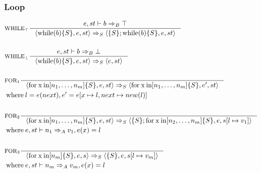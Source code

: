 \subsubsection{Loop}
\newcommand{\Tfor}{\mathbin{\text{for}}}
\newcommand{\Tx}{\mathbin{\text{x}}}
\newcommand{\Tin}{\mathbin{\text{in}}}
\newcommand{\Twhile}{\mathbin{\text{while}}}

\begin{align*}
&\inference[$\text{WHILE}_\top$]{e,st \vdash b \Rightarrow_B \top}
                       {\Braket{\Twhile(b)\{S\},e,st} \Rightarrow_S \Braket{\{S\}; \Twhile (b)\{S\},e,st}}
\\\\
&\inference[$\text{WHILE}_\bot$]{e,st \vdash b \Rightarrow_B \bot}
                       {\Braket{\Twhile(b)\{S\},e,st} \Rightarrow_S \Braket{e,st}}
\\\\
&\inference[$\text{FOR}_1$]{}
                       {\Braket{\Tfor \Tx \Tin [n_1,\dots,n_m]\{S\},e,st} \Rightarrow_S \Braket{\Tfor \mathbin{\text{x}} \mathbin{\text{in}} [n_1,\dots,n_m]\{S\},e',st}}
\\
&\mathbin{\text{where}} l = e(next), e' = e[x\mapsto l,next\mapsto new(l)]
\\\\
&\inference[$\text{FOR}_2$]{}
                       {\Braket{\Tfor \Tx \Tin [n_1,\dots,n_m]\{S\},e,st} \Rightarrow_S \Braket{\{S\}; \Tfor \mathbin{\text{x}} \mathbin{\text{in}} [n_2,\dots,n_m]\{S\},e,s[l\mapsto v_1]}}
\\
&\mathbin{\text{where}} e,st \vdash n_1 \Rightarrow_A v_1,e(x)=l
\\\\
&\inference[$\text{FOR}_3$]{}
                       {\Braket{\Tfor \mathbin{\text{x}} \mathbin{\text{in}} [n_m]\{S\},e,s} \Rightarrow_S \Braket{\{S\},e,s[l\mapsto v_m]}}
\\
&\mathbin{\text{where}} e,st \vdash n_m \Rightarrow_A v_m,e(x)=l
\end{align*}

